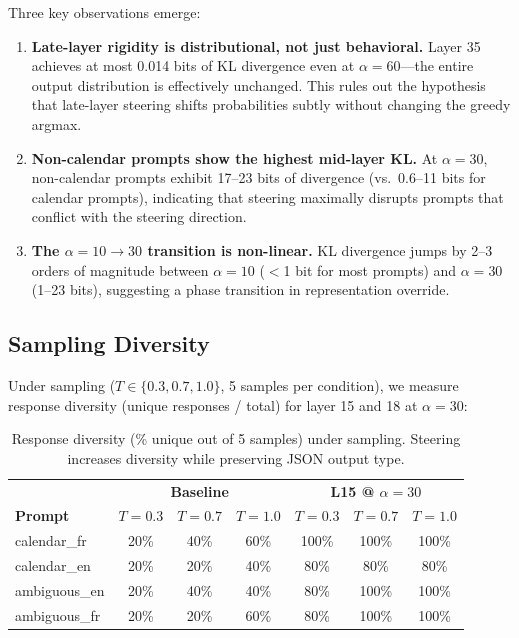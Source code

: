 \documentclass[11pt,a4paper]{article}
\begin{document}
Three key observations emerge:
\begin{enumerate}
    \item \textbf{Late-layer rigidity is distributional, not just behavioral.} Layer 35 achieves at most 0.014 bits of KL divergence even at $\alpha{=}60$---the entire output distribution is effectively unchanged. This rules out the hypothesis that late-layer steering shifts probabilities subtly without changing the greedy argmax.
    \item \textbf{Non-calendar prompts show the highest mid-layer KL.} At $\alpha{=}30$, non-calendar prompts exhibit 17--23 bits of divergence (vs.\ 0.6--11 bits for calendar prompts), indicating that steering maximally disrupts prompts that conflict with the steering direction.
    \item \textbf{The $\alpha{=}10 \to 30$ transition is non-linear.} KL divergence jumps by 2--3 orders of magnitude between $\alpha{=}10$ ($<$1 bit for most prompts) and $\alpha{=}30$ (1--23 bits), suggesting a phase transition in representation override.
\end{enumerate}

\subsection{Sampling Diversity}

Under sampling ($T \in \{0.3, 0.7, 1.0\}$, 5 samples per condition), we measure response diversity (unique responses / total) for layer 15 and 18 at $\alpha{=}30$:

\begin{table}[H]
\centering
\caption{Response diversity (\% unique out of 5 samples) under sampling. Steering increases diversity while preserving JSON output type.}
\label{tab:sampling_diversity}
\begin{tabular}{l|ccc|ccc}
\toprule
& \multicolumn{3}{c|}{\textbf{Baseline}} & \multicolumn{3}{c}{\textbf{L15 @ $\alpha{=}30$}} \\
\textbf{Prompt} & $T{=}0.3$ & $T{=}0.7$ & $T{=}1.0$ & $T{=}0.3$ & $T{=}0.7$ & $T{=}1.0$ \\
\midrule
calendar\_fr & 20\% & 40\% & 60\% & 100\% & 100\% & 100\% \\
calendar\_en & 20\% & 20\% & 40\% & 80\% & 80\% & 80\% \\
ambiguous\_en & 20\% & 40\% & 40\% & 80\% & 100\% & 100\% \\
ambiguous\_fr & 20\% & 20\% & 60\% & 80\% & 100\% & 100\% \\
\bottomrule
\end{tabular}
\end{table}
\end{document}
